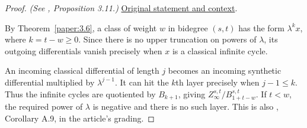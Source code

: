 \begin{proof}
\textit{(See \cite{LWX126}, Proposition 3.11.)} \href{paper/main.tex.html#L841}{Original statement and context}.

By Theorem~\ref{paper:3.6}, a class of weight $w$ in bidegree $(s,t)$ has the form $\lambda^k x$, where $k=t-w\ge0$. Since there is no upper truncation on powers of $\lambda$, its outgoing differentials vanish precisely when $x$ is a classical infinite cycle.

An incoming classical differential of length $j$ becomes an incoming synthetic differential multiplied by $\lambda^{j-1}$. It can hit the $k$th layer precisely when $j-1\le k$. Thus the infinite cycles are quotiented by $B_{k+1}$, giving $Z_\infty^{s,t}/B_{1+t-w}^{s,t}$. If $t<w$, the required power of $\lambda$ is negative and there is no such layer. This is also \cite{BHS}, Corollary A.9, in the article's grading.
\end{proof}

